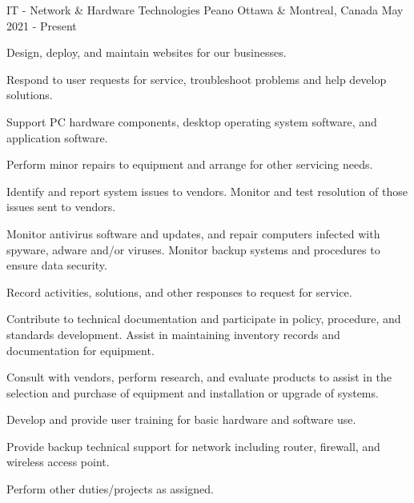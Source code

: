 

\begin{cventries}

  \cventry
    {IT - Network \& Hardware Technologies} %
    {Peano} %
    {Ottawa \& Montreal, Canada} %
    {May 2021 - Present} %
    {
      \begin{cvitems} %
        \item {Design, deploy, and maintain websites for our businesses.}
        \item {Respond to user requests for service, troubleshoot problems and help develop solutions.}
        \item {Support PC hardware components, desktop operating system software, and application software.}
        \item {Perform minor repairs to equipment and arrange for other servicing needs.}
        \item {Identify and report system issues to vendors. Monitor and test resolution of those issues sent to vendors.}
        \item {Monitor antivirus software and updates, and repair computers infected with spyware, adware and/or viruses. Monitor backup systems and procedures to ensure data security.}
        \item {Record activities, solutions, and other responses to request for service.}
        \item {Contribute to technical documentation and participate in policy, procedure, and standards development. Assist in maintaining inventory records and documentation for equipment.}
        \item {Consult with vendors, perform research, and evaluate products to assist in the selection and purchase of equipment and installation or upgrade of systems.}
        \item {Develop and provide user training for basic hardware and software use.}
        \item {Provide backup technical support for network including router, firewall, and wireless access point.}
        \item {Perform other duties/projects as assigned.}
      \end{cvitems}
    }


\end{cventries}
